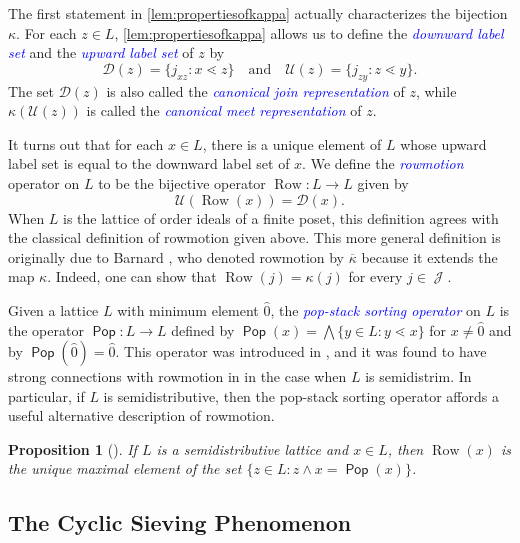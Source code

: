 \documentclass[11pt]{amsart}
\DeclareMathOperator{\Pop}{\mathsf{Pop}}
\newtheorem{proposition}[theorem]{Proposition}
\theoremstyle{definition}
\DeclareMathOperator{\row}{Row}
\DeclareMathOperator{\JJ}{\mathscr{J}}
\newcommand{\dfn}[1]{\textcolor{blue}{\emph{#1}}}
\begin{document}
The first statement in \cref{lem:propertiesofkappa} actually characterizes the bijection $\kappa$. For each $z\in L$, \cref{lem:propertiesofkappa} allows us to define the \dfn{downward label set} and the \dfn{upward label set} of $z$ by \[\mathcal D(z)=\{j_{xz}:x\lessdot z\}\quad\text{and}\quad\mathcal U(z)=\{j_{zy}:z\lessdot y\}.\] The set $\mathcal D(z)$ is also called the \dfn{canonical join representation} of $z$, while $\kappa(\mathcal U(z))$ is called the \dfn{canonical meet representation} of $z$. 

It turns out that for each $x\in L$, there is a unique element of $L$ whose upward label set is equal to the downward label set of $x$. We define the \dfn{rowmotion} operator on $L$ to be the bijective operator $\row\colon L\to L$ given by \[\mathcal U(\row(x))=\mathcal D(x).\] When $L$ is the lattice of order ideals of a finite poset, this definition agrees with the classical definition of rowmotion given above. This more general definition is originally due to Barnard \cite{Barnard}, who denoted rowmotion by $\overline\kappa$ because it extends the map $\kappa$. Indeed, one can show that $\row(j)=\kappa(j)$ for every $j\in\JJ$. 

Given a lattice $L$ with minimum element $\widehat 0$, the \dfn{pop-stack sorting operator} on $L$ is the operator $\Pop\colon L\to L$ defined by  $\Pop(x)=\bigwedge\{y\in L:y\lessdot x\}$ for $x\neq\widehat 0$ and by $\Pop(\widehat 0)=\widehat 0$. This operator was introduced in \cite{DefantMeeting}, and it was found to have strong connections with rowmotion in \cite{Semidistrim} in the case when $L$ is semidistrim. In particular, if $L$ is semidistributive, then the pop-stack sorting operator affords a useful alternative description of rowmotion. 

\begin{proposition}[{\cite[Section~9]{Semidistrim}}]\label{prop:pop1}
If $L$ is a semidistributive lattice and $x\in L$, then $\row(x)$ is the unique maximal element of the set $\{z\in L:z\wedge x=\Pop(x)\}$. 
\end{proposition}


\subsection{The Cyclic Sieving Phenomenon}\label{subsec:CSP}
\end{document}

